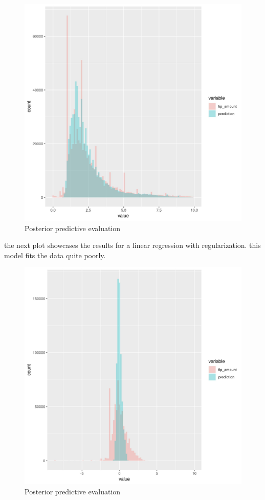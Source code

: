 \documentclass[11pt]{article}
\begin{document}
\begin{figure}[htbp]
\centering
\includegraphics[width=.9\linewidth]{./plots/evaluation2PosteriorPredictive.jpg}
\caption{\label{fig:org15f8343}
Posterior predictive evaluation}
\end{figure}

the next plot showcases the results for a linear regression with
regularization. this model fits the data quite poorly.

\begin{figure}[htbp]
\centering
\includegraphics[width=.9\linewidth]{./plots/evaluation3PosteriorPredictive.jpg}
\caption{\label{fig:org01709c2}
Posterior predictive evaluation}
\end{figure}
\end{document}
